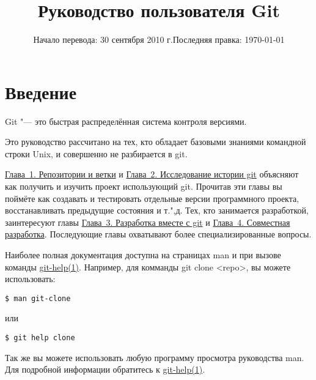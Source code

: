 \documentclass[a4paper, 11pt]{report}
\title{Руководство пользователя Git}
\date{Начало перевода: 30 сентября 2010 г.\linebreak Последняя правка: \today}
\begin{document}
\lstset{language=bash, 
		frame=trbl,
		frameround=tttt,
		basicstyle=\ttfamily\small , 
		keywordstyle=\textbf ,		
		commentstyle=\textit
		}

\maketitle
\tableofcontents


%
%
\newpage
\section*{Введение}
\hypertarget{#preface}{}

Git "--- это быстрая распределённая система контроля версиями.

Это руководство рассчитано на тех, кто обладает базовыми знаниями командной
строки Unix, и совершенно не разбирается в git.

\href{#chapter1}{Глава~1. Репозитории и ветки} и 
\href{#chapter2}{Глава~2. Исследование истории git} объясняют как 
получить и изучить проект использующий git. Прочитав эти главы вы поймёте как 
создавать и тестировать отдельные версии программного проекта, восстанавливать 
предыдущие состояния и т.",д. Тех, кто занимается разработкой, заинтересуют главы
\href{#chapter3}{Глава~3. Разработка вместе с git} и 
\href{#chapter4}{Глава~4. Совместная разработка}. Последующие главы 
охватывают более специализированные вопросы.

Наиболее полная документация доступна на страницах \textsf{man} и при вызове
команды \href{http://www.kernel.org/pub/software/scm/git/docs/git-help.html}
{git-help(1)}. Например, для комманды \textsf{git clone <repo>}, вы 
можете использовать:

\begin{lstlisting}
$ man git-clone
\end{lstlisting}

или

\begin{lstlisting}
$ git help clone
\end{lstlisting}

Так же вы можете использовать любую программу просмотра руководства
\textsf{man}.
Для подробной информации обратитесь к 
\href{http://www.kernel.org/pub/software/scm/git/docs/git-help.html}
{git-help(1)}.
\end{document}
